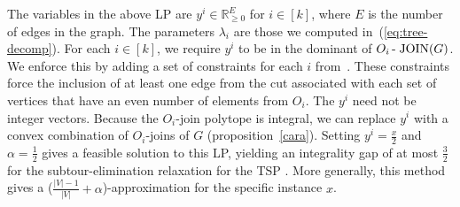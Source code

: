 The variables in the above LP are $y^i\in \mathbb{R}^{E}_{\geq 0}$ for $i\in [k]$, where $E$ is the number of edges in the graph.  The parameters $\lambda_i$ are those we computed in~(\ref{eq:tree-decomp}). For each $i\in [k]$, we require $y^i$ to be in the dominant of $O_i\operatorname{-\;JOIN}(G)$.  We enforce this by adding a set of constraints for each $i$ from~\cite[p. 490]{schrijverbook}. These constraints force the inclusion of at least one edge from the cut associated with each set of vertices that have an even number of elements from $O_i$. The  $y^i$ need not be integer vectors. Because the $O_i$-join polytope is integral, we can replace $y^i$ with a convex combination of $O_i$-joins of $G$ (proposition~\ref{cara}). Setting $y^i = \frac{x}{2}$ and $\alpha = \frac{1}{2}$ gives a feasible solution to this LP, yielding an integrality gap of at most $\frac{3}{2}$ for the subtour-elimination relaxation for the TSP \cite{wolsey}. More generally, this method gives a ($\frac{|V|-1}{|V|}+\alpha$)-approximation for the specific instance $x$. %



